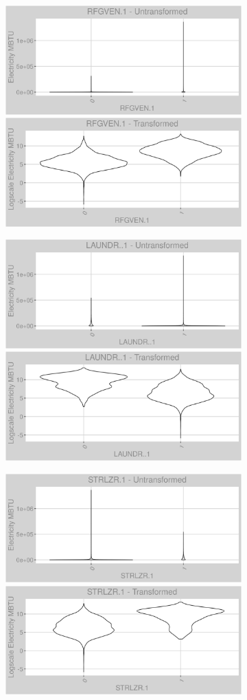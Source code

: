\newpage
\begin{figure}
\centering
\begin{subfigure}{1\textwidth}
\centering
\includegraphics[width=.49\textwidth, height=0.3\textheight]{Images/electricity_var_original_15.png}
\includegraphics[width=.49\textwidth, height=0.3\textheight]{Images/electricity_var_transformed_15.png}
\end{subfigure}
\begin{subfigure}{1\textwidth}
\centering
\includegraphics[width=.49\textwidth, height=0.3\textheight]{Images/electricity_var_original_16.png}
\includegraphics[width=.49\textwidth, height=0.3\textheight]{Images/electricity_var_transformed_16.png}
\end{subfigure}
\begin{subfigure}{1\textwidth}
\centering
\includegraphics[width=.49\textwidth, height=0.3\textheight]{Images/electricity_var_original_17.png}
\includegraphics[width=.49\textwidth, height=0.3\textheight]{Images/electricity_var_transformed_17.png}
\end{subfigure}
\end{figure}
